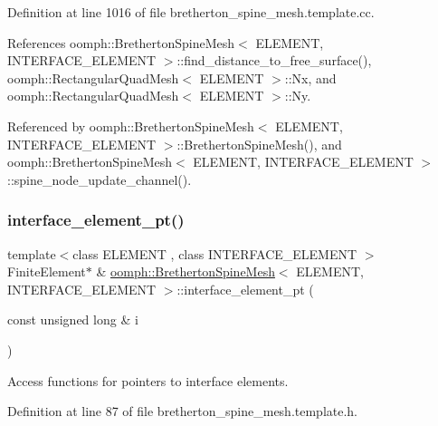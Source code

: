 Definition at line 1016 of file bretherton\+\_\+spine\+\_\+mesh.\+template.\+cc.



References oomph\+::\+Bretherton\+Spine\+Mesh$<$ E\+L\+E\+M\+E\+N\+T, I\+N\+T\+E\+R\+F\+A\+C\+E\+\_\+\+E\+L\+E\+M\+E\+N\+T $>$\+::find\+\_\+distance\+\_\+to\+\_\+free\+\_\+surface(), oomph\+::\+Rectangular\+Quad\+Mesh$<$ E\+L\+E\+M\+E\+N\+T $>$\+::\+Nx, and oomph\+::\+Rectangular\+Quad\+Mesh$<$ E\+L\+E\+M\+E\+N\+T $>$\+::\+Ny.



Referenced by oomph\+::\+Bretherton\+Spine\+Mesh$<$ E\+L\+E\+M\+E\+N\+T, I\+N\+T\+E\+R\+F\+A\+C\+E\+\_\+\+E\+L\+E\+M\+E\+N\+T $>$\+::\+Bretherton\+Spine\+Mesh(), and oomph\+::\+Bretherton\+Spine\+Mesh$<$ E\+L\+E\+M\+E\+N\+T, I\+N\+T\+E\+R\+F\+A\+C\+E\+\_\+\+E\+L\+E\+M\+E\+N\+T $>$\+::spine\+\_\+node\+\_\+update\+\_\+channel().

\mbox{\label{classoomph_1_1BrethertonSpineMesh_a3d14f3985d718867099747e5b3750fec}} 
\subsubsection{\texorpdfstring{interface\+\_\+element\+\_\+pt()}{interface\_element\_pt()}}
{\footnotesize\ttfamily template$<$class E\+L\+E\+M\+E\+NT , class I\+N\+T\+E\+R\+F\+A\+C\+E\+\_\+\+E\+L\+E\+M\+E\+NT $>$ \\
Finite\+Element$\ast$ \& \hyperlink{classoomph_1_1BrethertonSpineMesh}{oomph\+::\+Bretherton\+Spine\+Mesh}$<$ E\+L\+E\+M\+E\+NT, I\+N\+T\+E\+R\+F\+A\+C\+E\+\_\+\+E\+L\+E\+M\+E\+NT $>$\+::interface\+\_\+element\+\_\+pt (\begin{DoxyParamCaption}\item[{const unsigned long \&}]{i }\end{DoxyParamCaption})\hspace{0.3cm}{\ttfamily [inline]}}



Access functions for pointers to interface elements. 



Definition at line 87 of file bretherton\+\_\+spine\+\_\+mesh.\+template.\+h.



